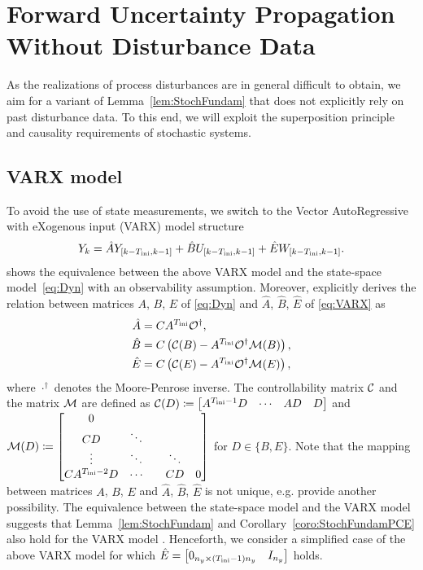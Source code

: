 \section{Forward Uncertainty Propagation Without Disturbance Data} \label{sec:MainResults}
As the realizations of process disturbances are in general difficult to obtain, we aim for a variant of Lemma~\ref{lem:StochFundam} that does not explicitly rely on past disturbance data. To this end, we will exploit the superposition principle and causality requirements of stochastic systems.

\subsection{VARX model}
To avoid the use of state measurements, we switch to the Vector AutoRegressive with eXogenous input (VARX) model structure
\[
	Y_{k} = \hat{A}Y_{[k-T_\text{ini},k-1]} + \hat{B}U_{[k-T_\text{ini},k-1]}
    + \hat{E}W_{[k-T_\text{ini},k-1]}.
\]
\citet{sadamoto23equivalence} shows the equivalence between the above VARX model and the state-space model~\eqref{eq:Dyn} with an observability assumption. Moreover, \citet{sadamoto23equivalence} explicitly derives the relation between matrices $A$, $B$, $E$ of \eqref{eq:Dyn} and $\hat{A}$, $\hat{B}$, $\hat{E}$ of \eqref{eq:VARX} as
\begin{align*}
	\hat{A} &= CA^{T_\text{ini}}\mathcal{O}^{\dagger},\\
	\hat{B} &= C\left(\mathcal{C}(B)-A^{T_\text{ini}}\mathcal{O}^{\dagger}\mathcal{M}(B) \right),\\
	\hat{E} &= C\left(\mathcal{C}(E)-A^{T_\text{ini}}\mathcal{O}^{\dagger}\mathcal{M}(E) \right),
\end{align*}
where $\cdot^\dagger$ denotes the Moore-Penrose inverse. The controllability matrix $\mathcal{C}$ and the matrix $\mathcal{M}$ are defined as $\mathcal{C}(D) \coloneqq \begin{bmatrix} A^{T_\text{ini}-1}D & \cdots & AD & D\end{bmatrix}$ and $\mathcal{M}(D) \coloneqq \begin{bmatrix} 0 \\ CD & \ddots \\ \vdots & \ddots & &\ddots \\ CA^{T_\text{ini}-2}D & \cdots & &CD & 0 \end{bmatrix}$ for $D\in\{B,E\}$.
Note that the mapping between matrices $A$, $B$, $E$ and $\hat{A}$, $\hat{B}$, $\hat{E}$ is not unique, e.g. \citet{phan96relationship} provide another possibility. The equivalence between the state-space model and the VARX model suggests that Lemma~\ref{lem:StochFundam} and Corollary~\ref{coro:StochFundamPCE} also hold for the VARX model \citep{pan24data}. Henceforth, we consider a simplified case of the above VARX model for which $\hat{E} = \begin{bmatrix}
	0_{n_y\times (T_\text{ini}-1)n_y} & I_{n_y}
\end{bmatrix}$ holds.
